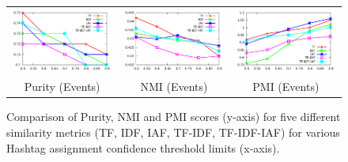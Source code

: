 \documentclass[10pt,a5paper,twoside]{article}
\begin{document}
\begin{figure}[t!]
\begin{center}
{\begin{tabular}{ccc}
	\vspace{-1mm}
		\includegraphics[width=200pt]{Figs/3-1.pdf} & 
		\includegraphics[width=200pt]{Figs/3-2.pdf} & 
		\includegraphics[width=200pt]{Figs/3-3.pdf} \\

		
\vspace{-2mm}
		{Purity (Events)} & {NMI (Events)} & 
		{PMI (Events)}\\

	
	\end{tabular}
}
\end{center}
\vspace{-4mm}
\caption{ \footnotesize Comparison of Purity, NMI and PMI scores
  (y-axis) for five different similarity metrics (TF, IDF, IAF,
  TF-IDF, TF-IDF-IAF) for various Hashtag assignment confidence
  threshold limits (x-axis).} \label{fig-1}
\end{figure}
\end{document}
